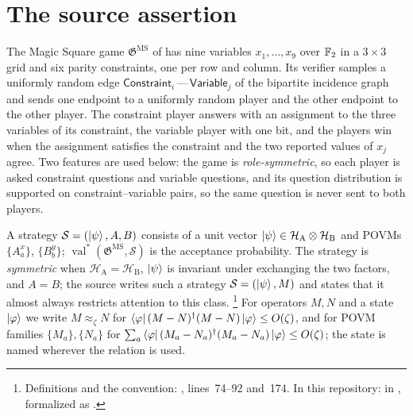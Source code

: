 \documentclass[11pt]{article}
\newcommand{\val}{\operatorname{val}}
\newcommand{\game}{\mathfrak{G}}
\newcommand{\strategy}{\mathcal{S}}
\newcommand{\MS}{\mathrm{MS}}
\newcommand{\mH}{\mathcal{H}}
\newcommand{\Constraint}{\mathsf{Constraint}}
\newcommand{\Variable}{\mathsf{Variable}}
\begin{document}
\section{The source assertion}

The Magic Square game $\game^{\MS}$ of \cite[Section~7]{Ji2020MIPStar} has nine
variables $x_1,\ldots,x_9$ over $\mathbb{F}_2$ in a $3\times 3$ grid and six parity
constraints, one per row and column.  Its verifier samples a uniformly random
edge $\Constraint_i \,\text{---}\, \Variable_j$ of the bipartite incidence
graph and sends one endpoint to a uniformly random player and the other
endpoint to the other player.  The constraint player answers with an
assignment to the three variables of its constraint, the variable player with
one bit, and the players win when the assignment satisfies the constraint and
the two reported values of $x_j$ agree.  Two features are used below: the game
is \emph{role-symmetric}, so each player is asked constraint questions and
variable questions, and its question distribution is supported on
constraint--variable pairs, so the same question is never sent to both
players.

A strategy $\strategy = (\ket{\psi}, A, B)$ consists of a unit vector
$\ket{\psi} \in \mH_{\mathrm A} \ot \mH_{\mathrm B}$ and POVMs $\{A^x_a\}$,
$\{B^y_b\}$; $\val^*(\game^{\MS},\strategy)$ is the acceptance probability.
The strategy is \emph{symmetric} when $\mH_{\mathrm A} = \mH_{\mathrm B}$,
$\ket{\psi}$ is invariant under exchanging the two factors, and $A = B$; the
source writes such a strategy $\strategy = (\ket{\psi}, M)$ and states that it
almost always restricts attention to this class.%
\footnote{Definitions and the convention:
, lines~74--92
and~174.  In this repository:  in
, formalized as
.}
For operators $M, N$ and a state $\ket{\varphi}$ we write
$M \approx_\zeta N$ for
$\bra{\varphi}(M-N)^\dagger(M-N)\ket{\varphi} \le O(\zeta)$, and for POVM
families $\{M_a\}, \{N_a\}$ for
$\sum_a \bra{\varphi}(M_a-N_a)^\dagger(M_a-N_a)\ket{\varphi} \le O(\zeta)$;
the state is named wherever the relation is used.
\end{document}
